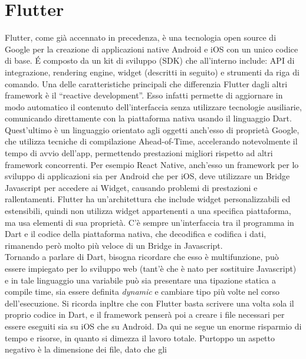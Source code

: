 \chapter{Flutter}
	Flutter, come già accennato in precedenza, è una tecnologia open source di Google
	per la creazione di applicazioni native Android e iOS con un unico codice di base.
	\'E composto da un kit di sviluppo (SDK) che all’interno include: API di integrazione,
	rendering engine, widget (descritti in seguito) e strumenti da riga di comando. Una delle
	caratteristiche principali che differenzia Flutter dagli altri framework è il
	“reactive development”. Esso infatti permette di aggiornare in modo automatico il
	contenuto dell’interfaccia senza utilizzare tecnologie ausiliarie, comunicando
	direttamente con la piattaforma nativa usando il linguaggio Dart. Quest'ultimo è un
	linguaggio orientato agli oggetti anch’esso di proprietà Google, che utilizza tecniche di
	compilazione Ahead-of-Time, accelerando notevolmente il tempo di avvio
	dell’app, permettendo prestazioni migliori rispetto ad altri framework
	concorrenti. Per esempio React Native, anch’esso un framework per lo sviluppo
	di applicazioni sia per Android che per iOS, deve utilizzare un Bridge
	Javascript per accedere ai Widget,
	causando problemi di prestazioni e rallentamenti.
	Flutter ha un'architettura che include widget personalizzabili ed
	estensibili, quindi non utilizza widget appartenenti a una specifica
	piattaforma, ma usa elementi
	di sua proprietà. C’è sempre un’interfaccia tra il programma in Dart e il codice
	della piattaforma nativa, che  decodifica e codifica i dati, rimanendo però molto più
	veloce di un Bridge in Javascript. \\
	Tornando a parlare di Dart, bisogna ricordare che esso è multifunzione, può
	essere impiegato per lo sviluppo web (tant'è che è nato
	per sostituire Javascript) e in tale linguaggio una variabile può sia
	presentare una tipazione statica a compile time, sia essere definita
	\textit{dynamic} e cambiare tipo più
	volte nel corso dell'esecuzione. Si ricorda inpltre che con Flutter basta
	scrivere una volta sola
	il proprio codice in Dart, e il framework penserà poi a creare i file
	necessari per essere eseguiti sia su iOS che su Android. Da qui ne segue un
	enorme risparmio di tempo e risorse, in quanto si dimezza il lavoro totale.
	Purtoppo un aspetto negativo è la dimensione dei file, dato che gli
